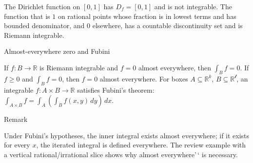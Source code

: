 \begin{example}

The Dirichlet function on \(\left\lbrack {0,1} \right\rbrack\) has \(D_{f} = \left\lbrack {0,1} \right\rbrack\) and is not integrable. The function that is \(1\) on rational points whose fraction is in lowest terms and has bounded denominator, and \(0\) elsewhere, has a countable discontinuity set and is Riemann integrable.

\end{example}

\begin{theorem}{Almost-everywhere zero and Fubini}

If \(f:B\rightarrow\mathbb{R}\) is Riemann integrable and \(f = 0\) almost everywhere, then \(\int_{B}f = 0\). If \(f \geq 0\) and \(\int_{B}f = 0\), then \(f = 0\) almost everywhere. For boxes \(A \subseteq \mathbb{R}^{k}\), \(B \subseteq \mathbb{R}^{\mathcal{l}}\), an integrable \(f:A \times B\rightarrow\mathbb{R}\) satisfies Fubini's theorem: \(\int_{A \times B}f = \int_{A}\left( {\int_{B}f\left( {x,y} \right)\, dy} \right)\, dx\).

\end{theorem}

\begin{qlremark}{Remark}

Under Fubini's hypotheses, the inner integral exists almost everywhere; if it exists for every \(x\), the iterated integral is defined everywhere. The review example with a vertical rational/irrational slice shows why almost everywhere'\,` is necessary.

\end{qlremark}
